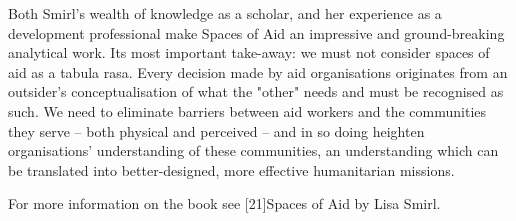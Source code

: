    Both Smirl's wealth of knowledge as a scholar, and her experience as a
   development professional make Spaces of Aid an impressive and
   ground-breaking analytical work. Its most important take-away: we must
   not consider spaces of aid as a tabula rasa. Every decision made by aid
   organisations originates from an outsider's conceptualisation of what
   the "other" needs and must be recognised as such. We need to eliminate
   barriers between aid workers and the communities they serve -- both
   physical and perceived -- and in so doing heighten organisations'
   understanding of these communities, an understanding which can be
   translated into better-designed, more effective humanitarian missions.

   For more information on the book see [21]Spaces of Aid by Lisa Smirl.

